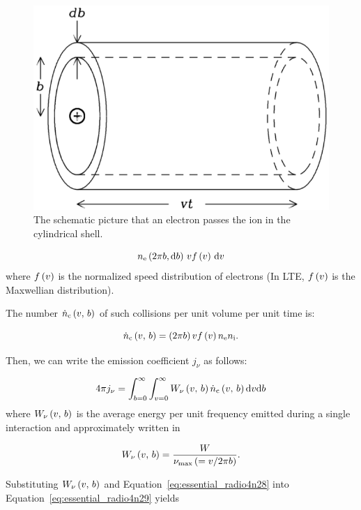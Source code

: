 \begin{figure}[htbp]
	\centering
	\includegraphics[width=.6\linewidth]{Chapter_2/Figures/NRAO_radio4n5.png}
    \caption[The schematic picuture of the cylindrical shell of electrons]{\label{fig:nrao_radio4n5}
        The schematic picture that an electron passes the ion in the cylindrical shell.
    }
\end{figure}

\begin{equation}\label{eq:essential_radio4n27}
    n_{\mathrm{e}} \left(2\pi b,\mathrm{d} b\right)\,v f\left(v\right)\,\mathrm{d} v
\end{equation}
where $f\left(v\right)$ is the normalized speed distribution of electrons (In LTE, $f\left(v\right)$ is the Maxwellian distribution).

The number $\dot{n}_{\mathrm{c}}\left(v,\,b\right)$ of such collisions per unit volume per unit time is:

\begin{equation}\label{eq:essential_radio4n28}
    \dot{n}_{\mathrm{c}}\left(v,\,b\right) = \left(2\pi b\right) v f\left(v\right) n_{\mathrm{e}} n_{\mathrm{i}}.
\end{equation}

Then, we can write the emission coefficient $j_{\nu}$ as follows:

\begin{equation}\label{eq:essential_radio4n29}
    4 \pi j_{\nu}=\int_{b=0}^{\infty} \int_{v=0}^{\infty} W_{\nu}\left(v,\,b\right) \dot{n}_{\mathrm{c}}\left(v,\,b\right) \mathrm{d} v \mathrm{d} b
\end{equation}
where $W_{\mathrm{\nu}}\left(v,\,b\right)$ is the average energy per unit frequency emitted during a single interaction and approximately written in

\begin{equation}\label{eq:maximum_frequency}
    W_{\mathrm{\nu}}\left(v,\,b\right) = \frac{W}{\nu_{\mathrm{\max}} \left(= v/2\pi b\right)}.
\end{equation}

Substituting $W_{\mathrm{\nu}}\left(v,\,b\right)$ and Equation~\ref{eq:essential_radio4n28} into Equation~\ref{eq:essential_radio4n29} yields

